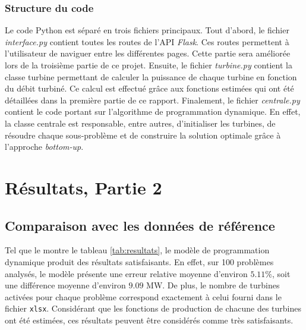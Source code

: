 \documentclass[12pt, letterpaper]{report}
\begin{document}
\subsection{Structure du code}
Le code Python est séparé en trois fichiers principaux.  Tout d'abord, le fichier \textit{interface.py} contient toutes les routes de l'API \textit{Flask}. Ces routes permettent à l'utilisateur de naviguer entre les différentes pages.  Cette partie sera améliorée lors de la troisième partie de ce projet.  Ensuite, le fichier \textit{turbine.py} contient la classe turbine permettant de calculer la puissance de chaque turbine en fonction du débit turbiné.  Ce calcul est effectué grâce aux fonctions estimées qui ont été détaillées dans la première partie de ce rapport.  Finalement, le fichier \textit{centrale.py} contient le code portant sur l'algorithme de programmation dynamique.  En effet, la classe centrale est responsable, entre autres, d'initialiser les turbines, de résoudre chaque sous-problème et de construire la solution optimale grâce à l'approche \textit{bottom-up}.

\chapter{Résultats, Partie 2}

\section{Comparaison avec les données de référence}
Tel que le montre le tableau \ref{tab:resultats}, le modèle de programmation dynamique produit des résultats satisfaisants. En effet, sur 100 problèmes analysés, le modèle présente une erreur relative moyenne d'environ $5.11\%$, soit une différence moyenne d'environ $9.09$ MW. De plus, le nombre de turbines activées pour chaque problème correspond exactement à celui fourni dans le fichier \texttt{xlsx}. Considérant que les fonctions de production de chacune des turbines ont été estimées, ces résultats peuvent être considérés comme très satisfaisants.
\end{document}
